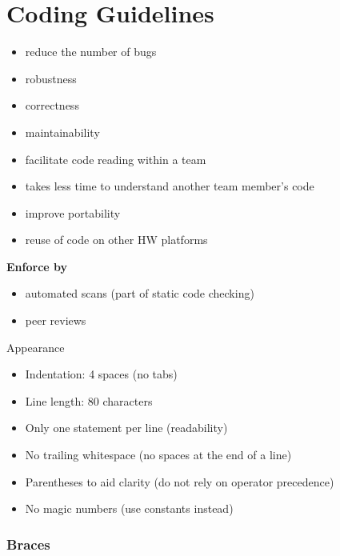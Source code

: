 \section{Coding Guidelines}


\begin{remark}
    \begin{itemize}
        \item reduce the number of bugs
        \item robustness
        \item correctness
        \item maintainability
        \item facilitate code reading within a team
        \item takes less time to understand another team member's code
        \item improve portability   
        \item reuse of code on other HW platforms
    \end{itemize}
    \textbf{Enforce by}
    \begin{itemize}
        \item automated scans (part of static code checking)
        \item peer reviews
    \end{itemize}
\end{remark}

\begin{definition}{Appearance}
    \begin{itemize}
        \item Indentation: 4 spaces (no tabs)
        \item Line length: 80 characters
        \item Only one statement per line (readability)
        \item No trailing whitespace (no spaces at the end of a line)
        \item Parentheses to aid clarity (do not rely on operator precedence)
        \item No magic numbers (use constants instead)
    \end{itemize}
\end{definition}

\multend

\subsubsection{Braces}

